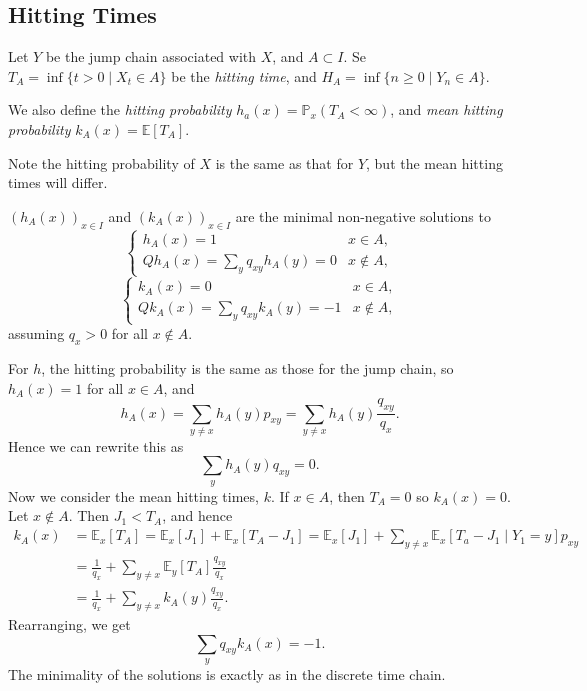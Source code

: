 \documentclass[12pt]{article}
\begin{document}
\subsection{Hitting Times}
\label{sub:hitting_times}

Let $Y$ be the jump chain associated with $X$, and $A \subset I$. Se $T_A = \inf\{t > 0 \mid X_t \in A\}$ be the \emph{hitting time}, and $H_A = \inf\{n \geq 0 \mid Y_n \in A\}$.

We also define the \emph{hitting probability} $h_a(x) = \mathbb{P}_x(T_A < \infty)$, and \emph{mean hitting probability} $k_A(x) = \mathbb{E}[T_A]$.

Note the hitting probability of $X$ is the same as that for $Y$, but the mean hitting times will differ.

\begin{theorem}
	$(h_A(x))_{x \in I}$ and $(k_{A}(x))_{x \in I}$ are the minimal non-negative solutions to
	\[
	\begin{cases}
		h_A(x) = 1 & x \in A, \\
		Qh_A(x) = \sum_{y} q_{xy} h_A(y) = 0 & x \not \in A,
	\end{cases}
	\]
	\[
	\begin{cases}
		k_A(x) = 0 & x \in A, \\
		Qk_A(x) = \sum_y q_{xy} k_A(y) = -1 & x \not \in A,
	\end{cases}
	\]
	assuming $q_x > 0$ for all $x \not \in A$.
\end{theorem}

\begin{proofbox}
	For $h$, the hitting probability is the same as those for the jump chain, so $h_A(x) = 1$ for all $x \in A$, and
	\[
	h_A(x) = \sum_{y \neq x} h_A(y) p_{xy} = \sum_{y \neq x} h_A(y) \frac{q_{xy}}{q_{x}}
	.\]
	Hence we can rewrite this as
	\[
	\sum_{y} h_A(y) q_{xy} = 0
	.\]
	Now we consider the mean hitting times, $k$. If $x \in A$, then $T_A = 0$ so $k_A(x) = 0$. Let $x \not \in A$. Then $J_1 < T_A$, and hence
	\begin{align*}
		k_A(x) &= \mathbb{E}_x[T_A] = \mathbb{E}_x[J_1] + \mathbb{E}_x[T_A - J_1] = \mathbb{E}_x[J_1] + \sum_{y \neq x} \mathbb{E}_x[T_a - J_1 \mid Y_1 = y] p_{xy} \\
		       &= \frac{1}{q_x} + \sum_{y \neq x} \mathbb{E}_y[T_A] \frac{q_{xy}}{q_x} \\
		       &= \frac{1}{q_x} + \sum_{y \neq x} k_A(y) \frac{q_{xy}}{q_x}.
	\end{align*}
	Rearranging, we get
	\[
	\sum_{y} q_{xy}k_A(x) = -1
	.\]
	The minimality of the solutions is exactly as in the discrete time chain.
\end{proofbox}
\end{document}
